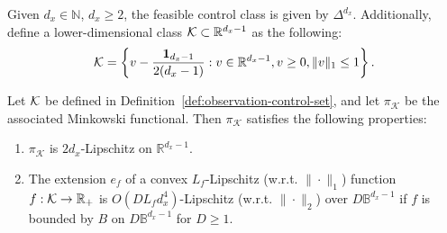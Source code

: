 \begin{definition} 
\label{def:observation-control-set}
Given $d_x\in\mathbb{N}$, $d_x\ge 2$, the feasible control class is given by  $\Delta^{d_x}$.
Additionally, define a lower-dimensional class $\mathcal{K}\subset\mathbb{R}^{d_x-1}$ as the following:
\begin{align}
\label{eq:pair-constrained-set}
    \mathcal{K}=\left\{v-\frac{\mathbf{1}_{d_x-1}}{2(d_x-1)}:v\in\mathbb{R}^{d_x-1},v\ge 0, \|v\|_1\le 1\right\}.
\end{align}
\end{definition}

\begin{lemma}
\label{cor:lip-control}
Let $\mathcal{K}$ be defined in Definition~\ref{def:observation-control-set}, and let $\pi_{\mathcal{K}}$ be the associated Minkowski functional. Then $\pi_{\mathcal{K}}$ satisfies the following properties:
\begin{enumerate}
\item $\pi_{\mathcal{K}}$ is $2d_x$-Lipschitz on $\mathbb{R}^{d_x-1}$. 
\item The extension $e_f$ of a convex $L_f$-Lipschitz (w.r.t. $\|\cdot\|_1$) function $f:\mathcal{K}\rightarrow\mathbb{R}_+$ is $O(DL_fd_x^4)$-Lipschitz (w.r.t. $\|\cdot\|_2$) over $D\mathbb{B}^{d_x-1}$ if $f$ is bounded by $B$ on $D\mathbb{B}^{d_x-1}$ for $D\ge 1$.
\end{enumerate}
\end{lemma}


